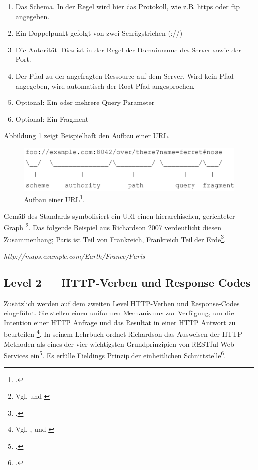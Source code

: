\begin{enumerate}
    \item Das Schema. In der Regel wird hier das Protokoll, wie z.B. https oder ftp angegeben.
    \item Ein Doppelpunkt gefolgt von zwei Schrägstrichen (://)
    \item Die Autorität. Dies ist in der Regel der Domainname des Server sowie der Port.
    \item Der Pfad zu der angefragten Ressource auf dem Server. Wird kein Pfad angegeben, wird automatisch der Root Pfad angesprochen.
    \item Optional: Ein oder mehrere Query Parameter
    \item Optional: Ein Fragment
\end{enumerate}

Abbildung \ref{abb:AufbauURL} zeigt Beispielhaft den Aufbau einer URL. 

\begin{figure}[htb]
\centering
\includegraphics[width=12cm]{graphics/aufbau-url.png}
\caption[aufbau-einer-url]{Aufbau einer URL\footcite[Vgl. ][S. 16]{berners-lee_uniform_2005-1}.}
\label{abb:AufbauURL}
\end{figure}

Gemäß des Standards symbolisiert ein URI einen hierarchischen, gerichteter Graph \footnote{Vgl. \cite[S. 118]{richardson_restful_2007} und \cite[S. 175]{palma_semantic_2017}}. Das folgende Beispiel aus Richardson 2007 verdeutlicht diesen Zusammenhang; Paris ist Teil von Frankreich, Frankreich Teil der Erde\footcite[Vgl. ][S. 118]{richardson_restful_2007}.

\emph{http://maps.example.com/Earth/France/Paris}

\subsection{Level 2 — HTTP-Verben und Response Codes}\label{subsection:level-2}

Zusätzlich werden auf dem zweiten Level HTTP-Verben und Response-Codes eingeführt. Sie stellen einen uniformen Mechanismus zur Verfügung, um die Intention einer HTTP Anfrage und das Resultat in einer HTTP Antwort zu beurteilen \footnote{Vgl. \cite[S. 15]{haupt_conversation_2015}, \cite[S. 237]{franch_detection_2014} und \cite[S. 23]{masse_rest_2012}}. In seinem Lehrbuch ordnet Richardson das Ausweisen der HTTP Methoden als eines der vier wichtigsten Grundprinzipien von RESTful Web Services ein\footcite[Vgl. ][S. 105]{richardson_restful_2007}. Es erfülle Fieldings Prinzip der einheitlichen Schnittstelle\footcite[Vgl. ][S. 79]{richardson_restful_2007}.

